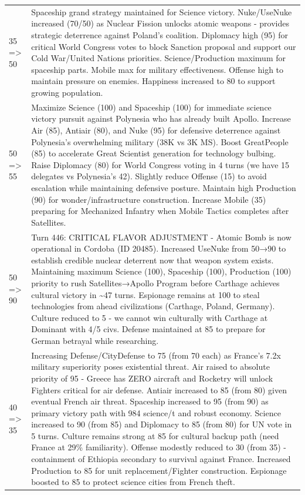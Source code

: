 \begin{longtable}{p{}p{}}
35 => 50 & Spaceship grand strategy maintained for Science victory. Nuke/UseNuke increased (70/50) as Nuclear Fission unlocks atomic weapons - provides strategic deterrence against Poland's coalition. Diplomacy high (95) for critical World Congress votes to block Sanction proposal and support our Cold War/United Nations priorities. Science/Production maximum for spaceship parts. Mobile max for military effectiveness. Offense high to maintain pressure on enemies. Happiness increased to 80 to support growing population. \\
50 => 55 & Maximize Science (100) and Spaceship (100) for immediate science victory pursuit against Polynesia who has already built Apollo. Increase Air (85), Antiair (80), and Nuke (95) for defensive deterrence against Polynesia's overwhelming military (38K vs 3K MS). Boost GreatPeople (85) to accelerate Great Scientist generation for technology bulbing. Raise Diplomacy (80) for World Congress voting in 4 turns (we have 15 delegates vs Polynesia's 42). Slightly reduce Offense (15) to avoid escalation while maintaining defensive posture. Maintain high Production (90) for wonder/infrastructure construction. Increase Mobile (35) preparing for Mechanized Infantry when Mobile Tactics completes after Satellites. \\
50 => 90 & Turn 446: CRITICAL FLAVOR ADJUSTMENT - Atomic Bomb is now operational in Cordoba (ID 20485). Increased UseNuke from 50→90 to establish credible nuclear deterrent now that weapon system exists. Maintaining maximum Science (100), Spaceship (100), Production (100) priority to rush Satellites→Apollo Program before Carthage achieves cultural victory in \textasciitilde 47 turns. Espionage remains at 100 to steal technologies from ahead civilizations (Carthage, Poland, Germany). Culture reduced to 5 - we cannot win culturally with Carthage at Dominant with 4/5 civs. Defense maintained at 85 to prepare for German betrayal while researching. \\
40 => 35 & Increasing Defense/CityDefense to 75 (from 70 each) as France's 7.2x military superiority poses existential threat. Air raised to absolute priority of 95 - Greece has ZERO aircraft and Rocketry will unlock Fighters critical for air defense. Antiair increased to 85 (from 80) given eventual French air threat. Spaceship increased to 95 (from 90) as primary victory path with 984 science/t and robust economy. Science increased to 90 (from 85) and Diplomacy to 85 (from 80) for UN vote in 5 turns. Culture remains strong at 85 for cultural backup path (need France at 29\% familiarity). Offense modestly reduced to 30 (from 35) - containment of Ethiopia secondary to survival against France. Increased Production to 85 for unit replacement/Fighter construction. Espionage boosted to 85 to protect science cities from French theft. \\

\end{longtable}
